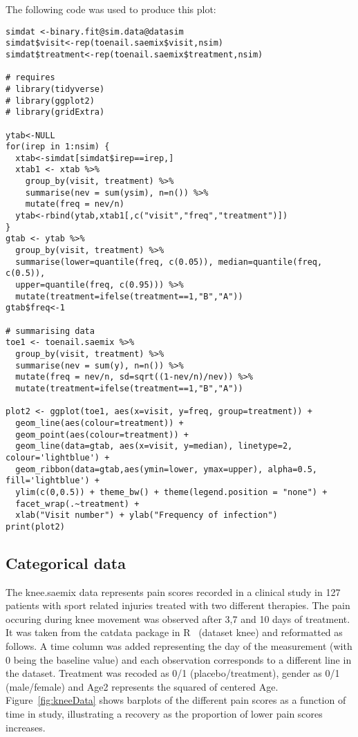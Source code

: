 The following code was used to produce this plot:
\begin{verbatim}
simdat <-binary.fit@sim.data@datasim
simdat$visit<-rep(toenail.saemix$visit,nsim)
simdat$treatment<-rep(toenail.saemix$treatment,nsim)
 
# requires 
# library(tidyverse)
# library(ggplot2)
# library(gridExtra)

ytab<-NULL
for(irep in 1:nsim) {
  xtab<-simdat[simdat$irep==irep,]
  xtab1 <- xtab %>%
    group_by(visit, treatment) %>%
    summarise(nev = sum(ysim), n=n()) %>%
    mutate(freq = nev/n)
  ytab<-rbind(ytab,xtab1[,c("visit","freq","treatment")])
}
gtab <- ytab %>%
  group_by(visit, treatment) %>%
  summarise(lower=quantile(freq, c(0.05)), median=quantile(freq, c(0.5)), 
  upper=quantile(freq, c(0.95))) %>%
  mutate(treatment=ifelse(treatment==1,"B","A"))
gtab$freq<-1

# summarising data
toe1 <- toenail.saemix %>%
  group_by(visit, treatment) %>%
  summarise(nev = sum(y), n=n()) %>%
  mutate(freq = nev/n, sd=sqrt((1-nev/n)/nev)) %>%
  mutate(treatment=ifelse(treatment==1,"B","A"))

plot2 <- ggplot(toe1, aes(x=visit, y=freq, group=treatment)) + 
  geom_line(aes(colour=treatment)) + 
  geom_point(aes(colour=treatment)) + 
  geom_line(data=gtab, aes(x=visit, y=median), linetype=2, colour='lightblue') + 
  geom_ribbon(data=gtab,aes(ymin=lower, ymax=upper), alpha=0.5, fill='lightblue') +
  ylim(c(0,0.5)) + theme_bw() + theme(legend.position = "none") + 
  facet_wrap(.~treatment) +
  xlab("Visit number") + ylab("Frequency of infection")
print(plot2)
\end{verbatim}


\clearpage
\newpage

\subsection{Categorical data} \label{sec:kneeCat}

The {\sf knee.saemix} data represents pain scores recorded in a clinical study in 127 patients with sport related injuries treated with two different therapies. The pain occuring during knee movement was observed after 3,7 and 10 days of treatment. It was taken from the {\sf catdata} package in R~\cite{catdata} (dataset {\sf knee}) and reformatted as follows. A time column was added representing the day of the measurement (with 0 being the baseline value) and each observation corresponds to a different line in the dataset. Treatment was recoded as 0/1 (placebo/treatment), gender as 0/1 (male/female) and {\sf Age2} represents the squared of centered Age. Figure~\ref{fig:kneeData} shows barplots of the different pain scores as a function of time in study, illustrating a recovery as the proportion of lower pain scores increases.

